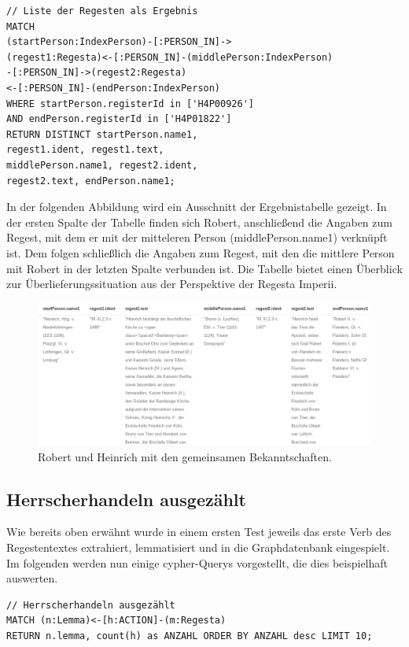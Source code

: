 \documentclass[ngerman,]{scrreprt}
\begin{document}
\begin{verbatim}
// Liste der Regesten als Ergebnis
MATCH
(startPerson:IndexPerson)-[:PERSON_IN]->
(regest1:Regesta)<-[:PERSON_IN]-(middlePerson:IndexPerson)
-[:PERSON_IN]->(regest2:Regesta)
<-[:PERSON_IN]-(endPerson:IndexPerson)
WHERE startPerson.registerId in ['H4P00926']
AND endPerson.registerId in ['H4P01822']
RETURN DISTINCT startPerson.name1,
regest1.ident, regest1.text,
middlePerson.name1, regest2.ident,
regest2.text, endPerson.name1;
\end{verbatim}

In der folgenden Abbildung wird ein Ausschnitt der Ergebnistabelle gezeigt. In der ersten Spalte der Tabelle finden sich Robert, anschließend die Angaben zum Regest, mit dem er mit der mitteleren Person (middlePerson.name1) verknüpft ist. Dem folgen schließlich die Angaben zum Regest, mit den die mittlere Person mit Robert in der letzten Spalte verbunden ist. Die Tabelle bietet einen Überblick zur Überlieferungssituation aus der Perspektive der Regesta Imperii.

\begin{figure}
\centering
\includegraphics{Bilder/RI2Graph/RobertHeinrichApocTabelle.png}
\caption{Robert und Heinrich mit den gemeinsamen Bekanntschaften.}
\end{figure}

\subsection{Herrscherhandeln ausgezählt}\label{herrscherhandeln-ausgezuxe4hlt}

Wie bereits oben erwähnt wurde in einem ersten Test jeweils das erste Verb des Regestentextes extrahiert, lemmatisiert und in die Graphdatenbank eingespielt. Im folgenden werden nun einige cypher-Querys vorgestellt, die dies beispielhaft auswerten.

\begin{verbatim}
// Herrscherhandeln ausgezählt
MATCH (n:Lemma)<-[h:ACTION]-(m:Regesta)
RETURN n.lemma, count(h) as ANZAHL ORDER BY ANZAHL desc LIMIT 10;
\end{verbatim}
\end{document}
